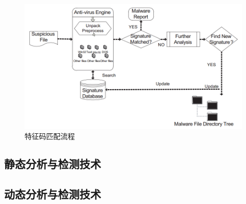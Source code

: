 \begin{figure}[!ht]
\centering
\includegraphics[width=4.5in]{img/intro/signatureFlow.png}
\caption{特征码匹配流程}
\label{fig:intro:signatureFlow}
\end{figure}

\subsection{静态分析与检测技术}
\subsection{动态分析与检测技术}